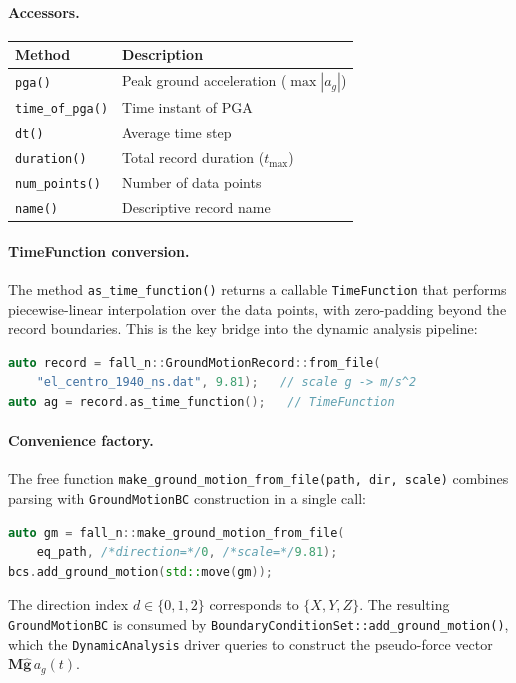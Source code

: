 \paragraph{Accessors.}
\begin{center}
\begin{tabular}{ll}
  \toprule
  Method & Description \\
  \midrule
  \texttt{pga()} & Peak ground acceleration ($\max |a_g|$) \\
  \texttt{time\_of\_pga()} & Time instant of PGA \\
  \texttt{dt()} & Average time step \\
  \texttt{duration()} & Total record duration ($t_{\max}$) \\
  \texttt{num\_points()} & Number of data points \\
  \texttt{name()} & Descriptive record name \\
  \bottomrule
\end{tabular}
\end{center}

\paragraph{TimeFunction conversion.}
The method \texttt{as\_time\_function()} returns a callable
\texttt{TimeFunction} that performs piecewise-linear interpolation
over the data points, with zero-padding beyond the record boundaries.
This is the key bridge into the dynamic analysis pipeline:
%
\begin{lstlisting}[language=C++,basicstyle=\ttfamily\small]
auto record = fall_n::GroundMotionRecord::from_file(
    "el_centro_1940_ns.dat", 9.81);   // scale g -> m/s^2
auto ag = record.as_time_function();   // TimeFunction
\end{lstlisting}

\paragraph{Convenience factory.}
The free function \texttt{make\_ground\_motion\_from\_file(path, dir,
scale)} combines parsing with \texttt{GroundMotionBC} construction
in a single call:
%
\begin{lstlisting}[language=C++,basicstyle=\ttfamily\small]
auto gm = fall_n::make_ground_motion_from_file(
    eq_path, /*direction=*/0, /*scale=*/9.81);
bcs.add_ground_motion(std::move(gm));
\end{lstlisting}
%
The direction index $d \in \{0,1,2\}$ corresponds to
$\{X, Y, Z\}$.  The resulting \texttt{GroundMotionBC} is consumed
by \texttt{BoundaryConditionSet::add\_ground\_motion()}, which the
\texttt{DynamicAnalysis} driver queries to construct the
pseudo-force vector $\mathbf{M}\hat{\mathbf{g}}\,a_g(t)$.


